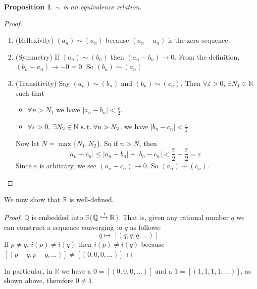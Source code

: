 \documentclass[12pt]{amsart}
\newcommand{\bbR}{\mathbb{R}}
\newcommand{\bbN}{\mathbb{N}}
\newcommand{\bbQ}{\mathbb{Q}}
\newcommand{\suchthat}{\operatorname{\thinspace s.t. \thinspace}}
\theoremstyle{plain}
\newtheorem*{prop}{Proposition}
\theoremstyle{remark}
\theoremstyle{definition}
\begin{document}
\begin{prop}
	$\sim$ is an equivalence relation.
\end{prop}
\begin{proof}
\hfill
\newline
	\begin{enumerate}
		\item (Reflexivity)
			$(a_n) \sim (a_n)$ because $(a_n - a_n)$ is the zero sequence.
		\item (Symmetry)
		If $(a_n) \sim (b_n)$ then $(a_n - b_n) \rightarrow 0$. From the definition, $(b_n - a_n) \rightarrow -0 = 0$. So $(b_n)\sim (a_n)$
		\item (Transitivity)
			Say $(a_n) \sim (b_n)$ and $(b_n) \sim (c_n)$. Then $\forall \varepsilon > 0$, $ \exists N_1 \in \bbN $ such that
			\begin{itemize}[-]
				\item 
					$\forall n > N_1$ we have $|a_n - b_n| < \displaystyle \frac{\varepsilon}{2}$.
				\item
					$\forall \varepsilon > 0$, $\exists N_2 \in \bbN \suchthat \forall n > N_2$, we have $|b_n - c_n| < \displaystyle \frac{\varepsilon}{2}$
			\end{itemize}
			Now let $N = \max\{N_1, N_2\}$. So if $n > N$, then 
			\begin{equation*}
				|a_n - c_n| \leqslant |a_n - b_n| + |b_n - c_n| < \frac{\varepsilon}{2} + \frac{\varepsilon}{2} = \varepsilon
			\end{equation*}
			Since $\varepsilon$ is arbitrary, we see $(a_n - c_n) \rightarrow 0$. So $(a_n) \sim (c_n)$.
	\end{enumerate}
\end{proof}

\par
We now show that $\bbR$ is well-defined.
\begin{proof}
		$\bbQ$ is embedded into $\bbR$($\bbQ \xhookrightarrow[]{\thinspace i\thinspace} \bbR$). That is, given any rational number $q$ we can construct a sequence converging to $q$ as follows:
		\begin{equation*}
			q \mapsto [(q,q,q,\dots)]
		\end{equation*}
		If $p \neq q$, $i(p) \neq i(q)$ then $i(p) \neq i(q)$ because $[(p - q, p - q,\dots)] \neq [(0,0,0,\dots)]$
\end{proof}

In particular, in $\bbR$ we have a $0 = [(0,0,0,\dots)]$ and a $1 = [(1,1,1,1,\dots)]$, as shown above, therefore $0 \neq 1$.
\end{document}
